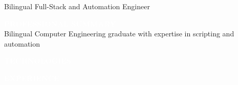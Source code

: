 \documentclass[9pt]{src/developercv} %
\begin{document}
{\huge Bilingual Full-Stack and Automation Engineer} %
\vspace{0.5cm}


\begin{minipage}[t]{0.4\textwidth} %
	\vspace{-\baselineskip} %
	\colorbox{cyan950}{\textcolor{white}{\MakeUppercase{\textbf{Professional Summary}}}}\\%
	
	Bilingual Computer Engineering graduate with expertise in scripting and automation\\ %
\end{minipage}
\hfill %
\begin{minipage}[t]{0.5\textwidth} %
	\vspace{-\baselineskip} %
	\colorbox{cyan950}{\textcolor{white}{\MakeUppercase{\textbf{Technologies}}}}\\%
	\begin{barchart}{10} %
	\end{barchart}
\end{minipage}


\vspace{\baselineskip} %
\colorbox{cyan900}{\textcolor{white}{\MakeUppercase{\textbf{Experience}}}}\\%
\end{document}
